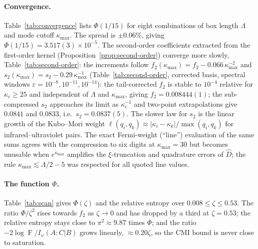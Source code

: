 \documentclass[11pt]{article}
\theoremstyle{accent}
\theoremstyle{definition}
\newcommand{\eps}{\varepsilon}
\newcommand{\Fid}{\operatorname{F}}
\begin{document}
\paragraph{Convergence.}
Table~\ref{tab:convergence} lists \(\Phi(1/15)\) for eight combinations of box length \(\Lambda\) and mode cutoff \(\kappa_{\max}\).  The spread is \(\pm0.06\%\), giving \(\Phi(1/15)=3.517(3)\times10^{-5}\).  The second-order coefficients extracted from the first-order kernel (Proposition~\ref{prop:second-order}) converge more slowly, Table~\ref{tab:second-order}: the increments follow \(f_2(\kappa_{\max})=f_2-0.066\,\kappa_{\max}^{-2}\) and \(s_2(\kappa_{\max})=s_2-0.29\,\kappa_{\max}^{-1}\) (Table~\ref{tab:second-order}, corrected basis, spectral windows \(\eps=10^{-8},10^{-11},10^{-14}\)): the tail-corrected \(f_2\) is stable to \(10^{-4}\) relative for \(\kappa_c\ge25\) and independent of \(\Lambda\) and \(\kappa_{\max}\), giving \(f_2=0.008444(1)\); the sub-compressed \(s_2\) approaches its limit as \(\kappa_c^{-1}\) and two-point extrapolations give \(0.0841\) and \(0.0833\), i.e.\ \(s_2=0.0837(5)\).  The slower law for \(s_2\) is the linear growth of the Kubo--Mori weight \(\ell(q_i,q_k)\approx|\kappa_i-\kappa_k|/\max(q_i,q_k)\) for infrared--ultraviolet pairs.  The exact Fermi-weight (``line'') evaluation of the same sums agrees with the compression to six digits at \(\kappa_{\max}=30\) but becomes unusable when \(e^{\kappa_{\max}}\) amplifies the \(\xi\)-truncation and quadrature errors of \(\widehat D\); the rule \(\kappa_{\max}\lesssim\Lambda/2-5\) was respected for all quoted line values.

\paragraph{The function \(\Phi\).}
Table~\ref{tab:scan} gives \(\Phi(\zeta)\) and the relative entropy over \(0.008\le\zeta\le0.53\).  The ratio \(\Phi/\zeta^2\) rises towards \(f_2\) as \(\zeta\to0\) and has dropped by a third at \(\zeta=0.53\); the relative entropy stays close to \(\pi^2\approx9.87\) times \(\Phi\); and the ratio \(-2\log\Fid/I_\omega(A{:}C|B)\) grows linearly, \(\approx0.20\zeta\), so the CMI bound is never close to saturation.
\end{document}
